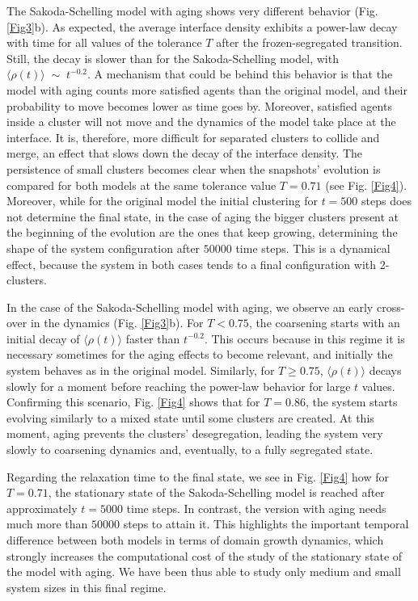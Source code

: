 The Sakoda-Schelling model with aging shows very different behavior (Fig. \ref{Fig3}b). As expected, the average interface density exhibits a power-law decay with time for all values of the tolerance $T$ after the frozen-segregated transition. Still, the decay is slower than for the Sakoda-Schelling model, with $\langle \rho (t)\rangle \; \sim \; t^{-0.2}$. A mechanism that could be behind this behavior is that the model with aging counts more satisfied agents than the original model, and their probability to move becomes lower as time goes by. Moreover, satisfied agents inside a cluster will not move and the dynamics of the model take place at the interface. It is, therefore, more difficult for separated clusters to collide and merge, an effect that slows down the decay of the interface density. The persistence of small clusters becomes clear when the snapshots' evolution is compared for both models at the same tolerance value $T = 0.71$ (see Fig. \ref{Fig4}). Moreover, while for the original model the initial clustering for $t = 500$ steps does not determine the final state, in the case of aging the bigger clusters present at the beginning of the evolution are the ones that keep growing, determining the shape of the system configuration after $50000$ time steps. This is a dynamical effect, because the system in both cases tends to a final configuration with 2-clusters.

In the case of the Sakoda-Schelling model with aging, we observe an early cross-over in the dynamics (Fig. \ref{Fig3}b). For $T < 0.75$, the coarsening starts with an initial decay of $\langle \rho (t)\rangle$ faster than $t^{-0.2}$. This occurs because in this regime it is necessary sometimes for the aging effects to become relevant, and initially the system behaves as in the original model. Similarly, for $T \ge 0.75$, $\langle \rho (t)\rangle$ decays slowly for a moment before reaching the power-law behavior for large $t$ values.  Confirming this scenario, Fig. \ref{Fig4} shows that for $T = 0.86$, the system starts evolving similarly to a mixed state until some clusters are created. At this moment, aging prevents the clusters' desegregation, leading the system very slowly to coarsening dynamics and, eventually, to a fully segregated state. 

Regarding the relaxation time to the final state, we see in Fig. \ref{Fig4} how for $T = 0.71$, the stationary state of the Sakoda-Schelling model is reached after approximately $t = 5000$ time steps. In contrast, the version with aging needs much more than $50000$ steps to attain it. This highlights the important temporal  difference between both models in terms of domain growth dynamics, which strongly increases the computational cost of the study of the stationary state of the model with aging. We have been thus able to study only medium and small system sizes in this final regime.

